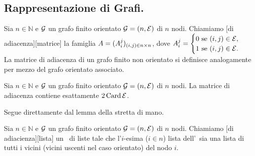 \subsection{Rappresentazione di Grafi.}
\label{Relazioni_RappresentazioneDiGrafi}
\begin{Definition}
  Sia $n \in \mathbb{N}$ e $\mathcal{G}$ un grafo finito orientato
  $\mathcal{G} = (n,\mathcal{E})$ di $n$ nodi. Chiamiamo
  [di adiacenza][matrice]
  la famiglia
  $A
    = (A_i^j)_{(i,j) \in n \times n}$, dove
  $A_i^j =
    \begin{cases}
      0\text{ se }(i,j) \in \mathcal{E},\\
      1\text{ se }(i,j) \in \mathcal{E}.
    \end{cases}$
  La matrice di adiacenza di un grafo finito non orientato si
  definisce analogamente per mezzo del grafo orientato associato.
\end{Definition}
\begin{Theorem}
  Sia $n \in \mathbb{N}$ e $\mathcal{G}$ un grafo finito orientato
  $\mathcal{G} = (n,\mathcal{E})$ di $n$ nodi. La matrice di adiacenza
  contiene esattamente $2 \operatorname{Card}{\mathcal{E}}$.
\end{Theorem}
\Proof Segue direttamente dal lemma della stretta di mano. \EndProof
\begin{Definition}
  Sia $n \in \mathbb{N}$ e $\mathcal{G}$ un grafo finito orientato
  $\mathcal{G} = (n,\mathcal{E})$ di $n$ nodi.
  Chiamiamo [di adiacienza][lista] un
  \Aarray\ di liste tale che l'$i$-esima ($i \in n$) lista dell'\Aarray\
  sia una lista di tutti i vicini (vicini uscenti nel caso orientato)
  del nodo $i$.
\end{Definition}
